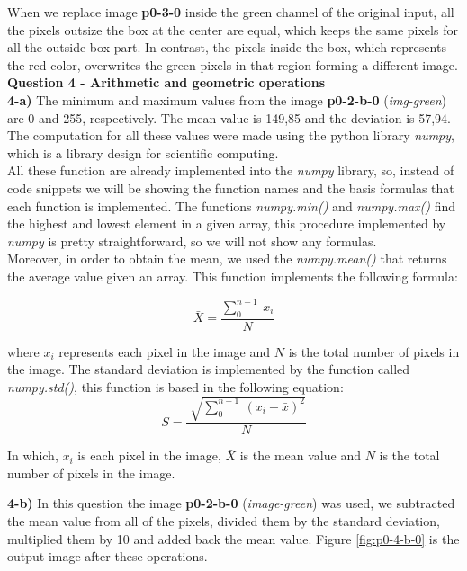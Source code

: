 \documentclass[12pt,a4paper]{article}
\begin{document}
When we replace image \textbf{p0-3-0} inside the green channel of the original input, all the pixels outsize the box at the center are equal, which keeps the same pixels for all the outside-box part. In contrast, the pixels inside the box, which represents the red color, overwrites the green pixels in that region forming a different image. \\


\textbf{Question 4 - Arithmetic and geometric operations} \\

\textbf{4-a) } The minimum and maximum values from the image \textbf{p0-2-b-0} (\emph{img-green}) are 0 and 255, respectively. The mean value is 149,85 and the deviation is 57,94. The computation for all these values were made using the python library \emph{numpy}, which is a library design for scientific computing. \\

All these function are already implemented into the \emph{numpy} library, so, instead of code snippets we will be showing the function names and the basis formulas that each function is implemented. The functions \emph{numpy.min()} and  \emph{numpy.max()} find the highest and lowest element in a given array, this procedure implemented by \emph{numpy} is pretty straightforward, so we will not show any formulas. \\

Moreover, in order to obtain the mean, we used the \emph{numpy.mean()} that returns the average value given an array. This function implements the following formula: 

$$\bar X = \frac{\sum_{0}^{n-1} \ x_i}{N}$$

where $x_i$ represents each pixel in the image and $N$ is the total number of pixels in the image. The standard deviation is implemented by the function called \emph{numpy.std()}, this function is based in the following equation:
$$ S = \frac{\sqrt[]{\sum_{0}^{n-1} \ (x_i - \bar{x})^2}}{N} $$

In which, $x_i$ is each pixel in the image, $\bar X$ is the mean value and $N$ is the total number of pixels in the image.

\newpage

\textbf{4-b) } In this question the image \textbf{p0-2-b-0} (\emph{image-green}) was used, we subtracted the mean value from all of the pixels, divided them by the standard deviation, multiplied them by 10 and added back the mean value. Figure \ref{fig:p0-4-b-0} is the output image after these operations.
\end{document}
